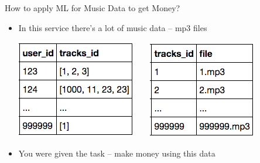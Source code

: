 \documentclass{beamer}
\begin{document}
\begin{frame}{How to apply ML for Music Data to get Money?}
\begin{itemize}
\begin{center}
		\end{center}
		\item In this service there's a lot of music data -- mp3 files
			\begin{center}
			\includegraphics[scale=0.4]{img/u2t}~~~~\includegraphics[scale=0.4]{img/t2f} 
			\end{center}
		\item You were given the task -- make money using this data
	\end{itemize}
\end{frame}
\end{document}
